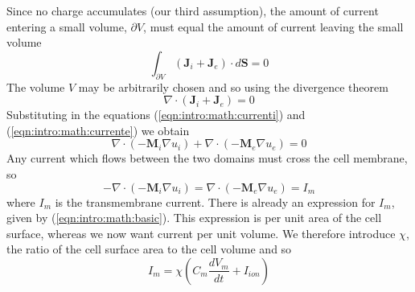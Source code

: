 Since no charge accumulates (our third assumption), the amount of current
entering a small volume, $\partial V$, must equal the amount of current leaving
the small volume
\begin{equation}
\label{eqn:intro:math:currentvolumeinteg}
\int_{\partial V} \left(\mathbf{J}_i + \mathbf{J}_e\right) \cdot d\mathbf{S} = 0
\end{equation}
The volume $V$ may be arbitrarily chosen and so using the divergence theorem
\begin{equation}
\label{eqn:intro:math:currentdiv}
\nabla \cdot \left(\mathbf{J}_i + \mathbf{J}_e\right) = 0
\end{equation}
Substituting in the equations (\ref{eqn:intro:math:currenti}) and
(\ref{eqn:intro:math:currente}) we obtain
\begin{equation}
\label{eqn:intro:math:currentdivsubst}
\nabla \cdot \left(- \mathbf{M}_i \nabla u_i \right) + \nabla \cdot \left(-\mathbf{M}_e \nabla u_e \right) = 0
\end{equation}
Any current which flows between the two domains must cross the cell membrane, so
\begin{equation}
\label{eqn:intro:math:currentdivim}
- \nabla \cdot \left(- \mathbf{M}_i \nabla u_i \right) = \nabla \cdot \left(-\mathbf{M}_e \nabla u_e \right) = I_m
\end{equation}
where $I_m$ is the transmembrane current.
There is already an expression for $I_m$, given by (\ref{eqn:intro:math:basic}).
This expression is per unit area of the cell surface, whereas we now want current per unit volume.
We therefore introduce $\chi$, the ratio of the cell surface area to the cell volume and so
\begin{equation}
\label{eqn:intro:math:im}
I_m = \chi \left(C_{m}\frac{dV_{m}}{dt} + I_{ion}\right)
\end{equation}

